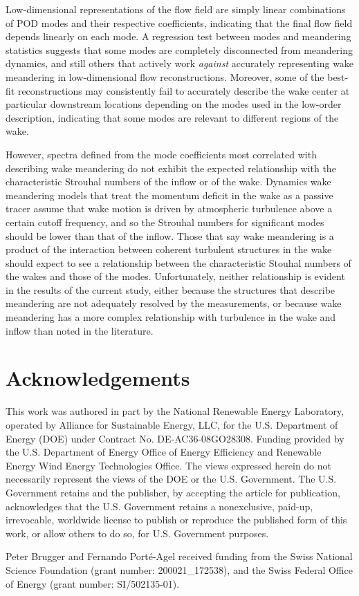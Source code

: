\documentclass[aip,amsmath,amssymb,preprint]{revtex4-2}
\begin{document}
Low-dimensional representations of the flow field are simply linear combinations of POD modes and their respective coefficients, indicating that the final flow field depends linearly on each mode.
A regression test between modes and meandering statistics suggests that some modes are completely disconnected from meandering dynamics, and still others that actively work \emph{against} accurately representing wake meandering in low-dimensional flow reconstructions.
Moreover, some of the best-fit reconstructions may consistently fail to accurately describe the wake center at particular downstream locations depending on the modes used in the low-order description, indicating that some modes are relevant to different regions of the wake.

However, spectra defined from the mode coefficients most correlated with describing wake meandering do not exhibit the expected relationship with the characteristic Strouhal numbers of the inflow or of the wake.
Dynamics wake meandering models that treat the momentum deficit in the wake as a passive tracer assume that wake motion is driven by atmospheric turbulence above a certain cutoff frequency, and so the Strouhal numbers for significant modes should be lower than that of the inflow.
Those that say wake meandering is a product of the interaction between coherent turbulent structures in the wake should expect to see a relationship between the characteristic Stouhal numbers of the wakes and those of the modes.
Unfortunately, neither relationship is evident in the results of the current study, either because the structures that describe meandering are not adequately resolved by the measurements, or because wake meandering has a more complex relationship with turbulence in the wake and inflow than noted in the literature.





\section*{Acknowledgements}

This work was authored in part by the National Renewable Energy Laboratory, operated by Alliance for Sustainable Energy, LLC, for the U.S. Department of Energy (DOE) under Contract No. DE-AC36-08GO28308. Funding provided by the U.S. Department of Energy Office of Energy Efficiency and Renewable Energy Wind Energy Technologies Office. The views expressed herein do not necessarily represent the views of the DOE or the U.S. Government. The U.S. Government retains and the publisher, by accepting the article for publication, acknowledges that the U.S. Government retains a nonexclusive, paid-up, irrevocable, worldwide license to publish or reproduce the published form of this work, or allow others to do so, for U.S. Government purposes. 

Peter Brugger and Fernando Porté-Agel received funding from the Swiss National Science Foundation (grant number: 200021\_172538), and the Swiss Federal Office of Energy (grant number: SI/502135-01).


\end{document}
